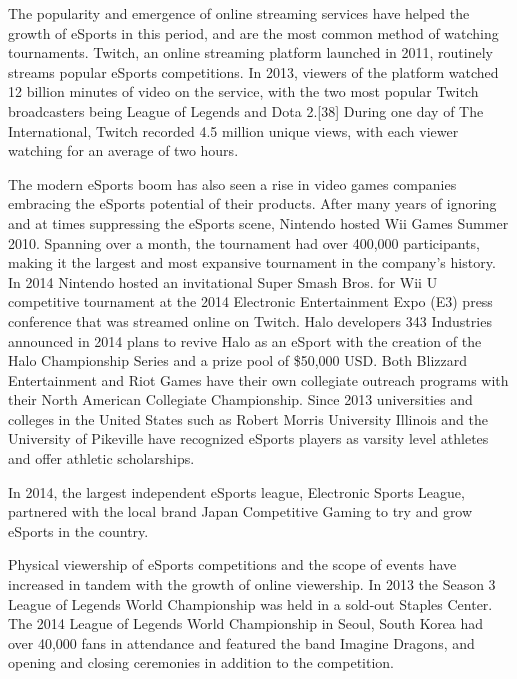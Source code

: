 		
		The popularity and emergence of online streaming services have helped the growth of eSports in this period, and are the most common method of watching tournaments. Twitch, an online streaming platform launched in 2011, routinely streams popular eSports competitions. In 2013, viewers of the platform watched 12 billion minutes of video on the service, with the two most popular Twitch broadcasters being League of Legends and Dota 2.[38] During one day of The International, Twitch recorded 4.5 million unique views, with each viewer watching for an average of two hours.
		
		The modern eSports boom has also seen a rise in video games companies embracing the eSports potential of their products. After many years of ignoring and at times suppressing the eSports scene, Nintendo hosted Wii Games Summer 2010. Spanning over a month, the tournament had over 400,000 participants, making it the largest and most expansive tournament in the company's history. In 2014 Nintendo hosted an invitational Super Smash Bros. for Wii U competitive tournament at the 2014 Electronic Entertainment Expo (E3) press conference that was streamed online on Twitch. Halo developers 343 Industries announced in 2014 plans to revive Halo as an eSport with the creation of the Halo Championship Series and a prize pool of \$50,000 USD. Both Blizzard Entertainment and Riot Games have their own collegiate outreach programs with their North American Collegiate Championship. Since 2013 universities and colleges in the United States such as Robert Morris University Illinois and the University of Pikeville have recognized eSports players as varsity level athletes and offer athletic scholarships.
		
		In 2014, the largest independent eSports league, Electronic Sports League, partnered with the local brand Japan Competitive Gaming to try and grow eSports in the country.
		
		Physical viewership of eSports competitions and the scope of events have increased in tandem with the growth of online viewership. In 2013 the Season 3 League of Legends World Championship was held in a sold-out Staples Center. The 2014 League of Legends World Championship in Seoul, South Korea had over 40,000 fans in attendance and featured the band Imagine Dragons, and opening and closing ceremonies in addition to the competition.
	
		\newpage
